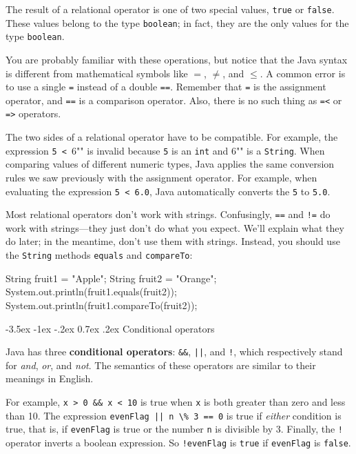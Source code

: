 \documentclass[12pt]{book}
\makeatletter
\theoremstyle{exercise}
\newcommand{\java}[1]{\verb"#1"}
\renewcommand{\section}{\@startsection{section}{1}{\z@}%
    {-3.5ex \@plus -1ex \@minus -.2ex}%
    {0.7ex \@plus.2ex}%
    {\normalfont\Large\bfseries}}
\newcommand{\java}[1]{\lstinline{#1}} %
\makeatother
\begin{document}
The result of a relational operator is one of two special values, \java{true} or \java{false}.
These values belong to the type \java{boolean}; in fact, they are the only values for the type \java{boolean}.

You are probably familiar with these operations, but notice that the Java syntax is different from mathematical symbols like $=$, $\neq$, and $\le$.
A common error is to use a single \java{=} instead of a double \java{==}.
Remember that \java{=} is the assignment operator, and \java{==} is a comparison operator.
Also, there is no such thing as \java{=<} or \java{=>} operators.

The two sides of a relational operator have to be compatible.
For example, the expression \java{5 < "6"} is invalid because \java{5} is an \java{int} and \java{"6"} is a \java{String}.
When comparing values of different numeric types, Java applies the same conversion rules we saw previously with the assignment operator.
For example, when evaluating the expression \java{5 < 6.0}, Java automatically converts the \java{5} to \java{5.0}.

Most relational operators don't work with strings.
Confusingly, \java{==} and \java{!=} do work with strings---they just don't do what you expect.
We'll explain what they do later; in the meantime, don't use them with strings.
Instead, you should use the \java{String} methods \java{equals} and \java{compareTo}:

\begin{code}
    String fruit1 = "Apple";
    String fruit2 = "Orange";
    System.out.println(fruit1.equals(fruit2));
    System.out.println(fruit1.compareTo(fruit2));
\end{code}



\section{Conditional operators}


Java has three {\bf conditional operators}: \java{&&}, \java{||}, and \java{!}, which respectively stand for {\it and}, {\it or}, and {\it not}.
The semantics of these operators are similar to their meanings in English.

For example, \java{x > 0 && x < 10} is true when \java{x} is both greater than zero and less than 10.
The expression \java{evenFlag || n \% 3 == 0} is true if {\it either} condition is true, that is, if \java{evenFlag} is true or the number \java{n} is divisible by 3.
Finally, the \java{!} operator inverts a boolean expression.
So \java{!evenFlag} is \java{true} if \java{evenFlag} is \java{false}.
\end{document}
